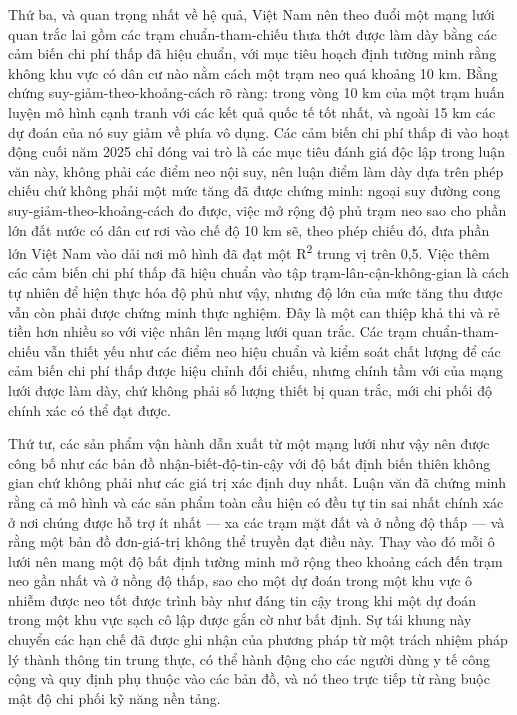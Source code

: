 Thứ ba, và quan trọng nhất về hệ quả, Việt Nam nên theo đuổi một mạng lưới quan trắc lai gồm các trạm chuẩn-tham-chiếu thưa thớt được làm dày bằng các cảm biến chi phí thấp đã hiệu chuẩn, với mục tiêu hoạch định tường minh rằng không khu vực có dân cư nào nằm cách một trạm neo quá khoảng 10 km. Bằng chứng suy-giảm-theo-khoảng-cách rõ ràng: trong vòng 10 km của một trạm huấn luyện mô hình cạnh tranh với các kết quả quốc tế tốt nhất, và ngoài 15 km các dự đoán của nó suy giảm về phía vô dụng. Các cảm biến chi phí thấp đi vào hoạt động cuối năm 2025 chỉ đóng vai trò là các mục tiêu đánh giá độc lập trong luận văn này, không phải các điểm neo nội suy, nên luận điểm làm dày dựa trên phép chiếu chứ không phải một mức tăng đã được chứng minh: ngoại suy đường cong suy-giảm-theo-khoảng-cách đo được, việc mở rộng độ phủ trạm neo sao cho phần lớn đất nước có dân cư rơi vào chế độ 10 km sẽ, theo phép chiếu đó, đưa phần lớn Việt Nam vào dải nơi mô hình đã đạt một R\textsuperscript{2} trung vị trên 0,5. Việc thêm các cảm biến chi phí thấp đã hiệu chuẩn vào tập trạm-lân-cận-không-gian là cách tự nhiên để hiện thực hóa độ phủ như vậy, nhưng độ lớn của mức tăng thu được vẫn còn phải được chứng minh thực nghiệm. Đây là một can thiệp khả thi và rẻ tiền hơn nhiều so với việc nhân lên mạng lưới quan trắc. Các trạm chuẩn-tham-chiếu vẫn thiết yếu như các điểm neo hiệu chuẩn và kiểm soát chất lượng để các cảm biến chi phí thấp được hiệu chỉnh đối chiếu, nhưng chính tầm với của mạng lưới được làm dày, chứ không phải số lượng thiết bị quan trắc, mới chi phối độ chính xác có thể đạt được.

Thứ tư, các sản phẩm vận hành dẫn xuất từ một mạng lưới như vậy nên được công bố như các bản đồ nhận-biết-độ-tin-cậy với độ bất định biến thiên không gian chứ không phải như các giá trị xác định duy nhất. Luận văn đã chứng minh rằng cả mô hình và các sản phẩm toàn cầu hiện có đều tự tin sai nhất chính xác ở nơi chúng được hỗ trợ ít nhất --- xa các trạm mặt đất và ở nồng độ thấp --- và rằng một bản đồ đơn-giá-trị không thể truyền đạt điều này. Thay vào đó mỗi ô lưới nên mang một độ bất định tường minh mở rộng theo khoảng cách đến trạm neo gần nhất và ở nồng độ thấp, sao cho một dự đoán trong một khu vực ô nhiễm được neo tốt được trình bày như đáng tin cậy trong khi một dự đoán trong một khu vực sạch cô lập được gắn cờ như bất định. Sự tái khung này chuyển các hạn chế đã được ghi nhận của phương pháp từ một trách nhiệm pháp lý thành thông tin trung thực, có thể hành động cho các người dùng y tế công cộng và quy định phụ thuộc vào các bản đồ, và nó theo trực tiếp từ ràng buộc mật độ chi phối kỹ năng nền tảng.

